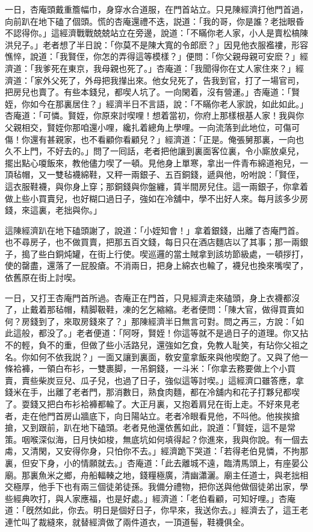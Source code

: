 一日，杏庵頭戴重簷幅巾，身穿水合道服，在門首站立。只見陳經濟打他門首過，向前趴在地下磕了個頭。慌的杏庵還禮不迭，説道：「我的哥，你是誰？老拙眼昏不認得你。」這經濟戰戰兢兢站立在旁邊，說道：「不瞞你老人家，小人是賣松槁陳洪兒子。」老者想了半日說：「你莫不是陳大寬的令郎麽？」因見他衣服襤褸，形容憔悴，說道：「我賢侄，你怎的弄得這等模樣？」便問：「你父親母親可安麽？」經濟道：「我爹死在東京，我母親也死了。」杏庵道：「我聞得你在丈人家住來？」經濟道：「家外父死了，外母把我攆出來。他女兒死了，告我到官，打了一場官司，把房兒也賣了。有些本錢兒，都喫人坑了。一向閑着，沒有營運。」杏庵道：「賢姪，你如今在那裏居住？」經濟半日不言語，說：「不瞞你老人家說，如此如此。」杏庵道：「可憐。賢姪，你原來討喫哩！想着當初，你府上那樣根基人家！我與你父親相交，賢姪你那咱還小哩，纔扎着總角上學哩。一向流落到此地位，可傷可傷！你還有甚親家，也不看顧你看顧兒？」經濟道：「正是。俺張舅那裏，一向也久不上門，不好去的。」問了一囘話，老者把他讓到裏面客位裏，令小廝放桌兒，擺出點心嗄飯來，教他儘力喫了一頓。見他身上單寒，拿出一件青布綿道袍兒，一頂毡帽，又一雙毡襪綿鞋，又秤一兩銀子、五百銅錢，遞與他，吩咐說：「賢侄，這衣服鞋襪，與你身上穿；那銅錢與你盤纏，賃半間房兒住。這一兩銀子，你拿着做上些小買賣兒，也好糊口過日子，強如在冷舖中，學不出好人來。每月該多少房錢，來這裏，老拙與你。」

這陳經濟趴在地下磕頭謝了，說道：「小姪知會！」拿着銀錢，出離了杏庵門首。也不尋房子，也不做買賣，把那五百文錢，每日只在酒店麵店以了其事；那一兩銀子，搗了些白銅炖罐，在街上行使。喫巡邏的當土賊拿到該坊節級處，一頓拶打，使的罄盡，還落了一屁股瘡。不消兩日，把身上綿衣也輸了，襪兒也換來嘴喫了，依舊原在街上討喫。

一日，又打王杏庵門首所過。杏庵正在門首，只見經濟走來磕頭，身上衣襪都沒了，止戴着那毡帽，精脚靸鞋，凍的乞乞縮縮。老者便問：「陳大官，做得買賣如何？房錢到了，來取房錢來了？」那陳經濟半日無言可對。問之再三，方說：「如此這般，都没了。」老者便道：「阿呀，賢姪！你這等就不是過日子的道理。你又拈不的輕，負不的重，但做了些小活路兒，還強如乞食，免教人耻笑，有玷你父祖之名。你如何不依我説？」一面又讓到裏面，敎安童拿飯來與他喫飽了。又與了他一條袷褲，一領白布衫，一雙裹脚，一吊銅錢，一斗米：「你拿去務要做上个小買賣，賣些柴炭豆兒、瓜子兒，也過了日子，強似這等討喫。」這經濟口雖答應，拿錢米在手，出離了老者門，那消數日，熟食肉麵，都在冷舖内和花子打夥兒都喫了。耍錢又把白布衫袷褲都輸了。大正月裏，又抱着肩兒在街上走。不好來見老者，走在他門首房山牆底下，向日陽站立。老者冷眼看見他，不呌他。他挨挨搶搶，又到跟前，趴在地下磕頭。老者見他還依舊如此，說道：「賢姪，這不是常策。咽喉深似海，日月快如梭，無底坑如何填得起？你進來，我與你說。有一個去䖏，又清閑，又安得你身，只怕你不去。」經濟跪下哭道：「若得老伯見憐，不拘那裏，但安下身，小的情願就去。」杏庵道：「此去離城不遠，臨清馬頭上，有座晏公廟。那裏魚米之鄉，舟船輻輳之地，錢糧極廣，清幽瀟灑。廟主任道士，與老拙相交極厚，他手下也有兩三個徒弟徒孫。我備分禮物，把你送與他做個徒弟出家，學些經典吹打，與人家應福，也是好處。」經濟道：「老伯看顧，可知好哩。」杏庵道：「旣然如此，你去。明日是個好日子，你早來，我送你去。」經濟去了，這王老連忙叫了裁縫來，就替經濟做了兩件道衣，一頂道髻，鞋襪俱全。

